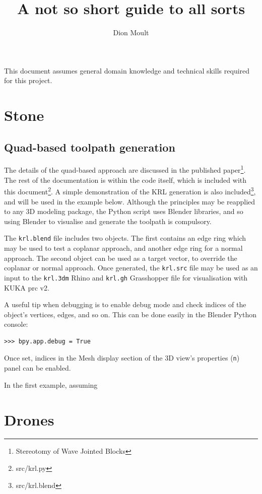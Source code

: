 \documentclass{article}
\author{Dion Moult}
\title{A not so short guide to all sorts}
\begin{document}
\maketitle
This document assumes general domain knowledge and technical skills required for this project.
\section{Stone}
\subsection{Quad-based toolpath generation}
The details of the quad-based approach are discussed in the published paper\footnote{Stereotomy of Wave Jointed Blocks}. The rest of the documentation is within the code itself, which is included with this document\footnote{src/krl.py}. A simple demonstration of the KRL generation is also included\footnote{src/krl.blend}, and will be used in the example below. Although the principles may be reapplied to any 3D modeling package, the Python script uses Blender libraries, and so using Blender to visualise and generate the toolpath is compulsory.

The {\tt krl.blend} file includes two objects. The first contains an edge ring which may be used to test a coplanar approach, and another edge ring for a normal approach. The second object can be used as a target vector, to override the coplanar or normal approach. Once generated, the {\tt krl.src} file may be used as an input to the {\tt krl.3dm} Rhino and {\tt krl.gh} Grasshopper file for visualisation with KUKA prc v2.

A useful tip when debugging is to enable debug mode and check indices of the object's vertices, edges, and so on. This can be done easily in the Blender Python console:

\begin{lstlisting}
>>> bpy.app.debug = True
\end{lstlisting}

Once set, indices in the Mesh display section of the 3D view's properties ({\tt n}) panel can be enabled.

In the first example, assuming %
\section{Drones}
\end{document}
